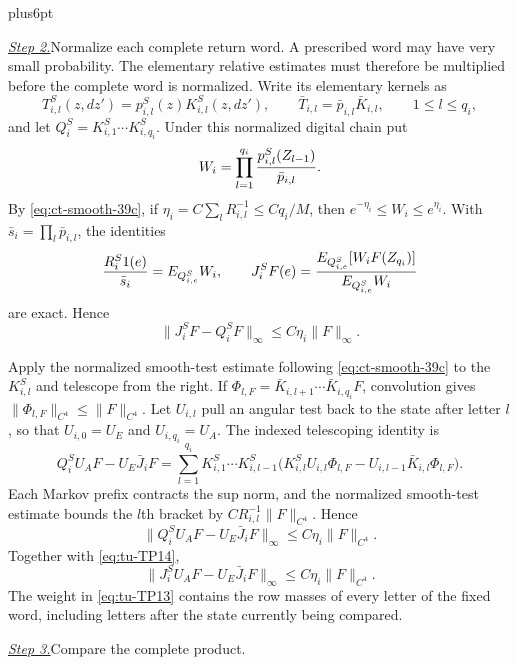 \documentclass[12pt,reqno]{amsart}
\makeatletter
\theoremstyle{plain}
\theoremstyle{definition}
\theoremstyle{remark}
\renewenvironment{proof}[1][\proofname]{%
  \par
  \pushQED{\qed}%
  \normalfont
  \topsep6pt plus6pt\relax
  \trivlist
  \item[\hskip\labelsep\slshape #1\@addpunct{.}]%
  \ignorespaces
}{%
  \popQED
  \endtrivlist
  \@endpefalse
}
\DeclareRobustCommand{\qed}{%
  \leavevmode\unskip\penalty9999\hbox{}\nobreak
  \ifmmode
    \makebox[0pt][l]{\qquad\hbox{\qedsymbol}}%
  \else
    \qquad\hbox{\qedsymbol}%
  \fi
}
\renewcommand{\qedsymbol}{\rule[.47pt]{4pt}{6pt}}
\numberwithin{equation}{section}
\makeatother
\begin{document}
\begin{proof}[Proof of Lemma~\ref{lem:typed-centered-endpoint-product}]
\smallskip\noindent
\underline{\textit{Step 2.}}\quad Normalize each complete return word.
A prescribed word may have very small probability. The elementary
relative estimates must therefore be multiplied before the complete word
is normalized. Write its elementary kernels as
\[
 T_{i,l}^S(z,dz')=p_{i,l}^S(z)K_{i,l}^S(z,dz'),\qquad
 \bar T_{i,l}=\bar p_{i,l}\bar K_{i,l},\qquad1\le l\le q_i,
\]
and let \(Q_i^S=K_{i,1}^S\cdots K_{i,q_i}^S\).  Under this normalized
digital chain put
\[
 W_i=\prod_{l=1}^{q_i}{p_{i,l}^S(Z_{l-1})\over\bar p_{i,l}}.
\]
By \eqref{eq:ct-smooth-39c}, if \(\eta_i=C\sum_lR_{i,l}^{-1}\le Cq_i/M\), then
\(e^{-\eta_i}\le W_i\le e^{\eta_i}\).  With
\(\bar s_i=\prod_l\bar p_{i,l}\), the identities
\begin{equation}
 {R_i^S1(e)\over\bar s_i}=E_{Q_{i,e}^S}W_i,\qquad
 J_i^SF(e)={E_{Q_{i,e}^S}[W_iF(Z_{q_i})]
                 \over E_{Q_{i,e}^S}W_i}                  \label{eq:tu-TP13}
\end{equation}
are exact.  Hence
\begin{equation}
             \|J_i^SF-Q_i^SF\|_\infty
             \le C\eta_i\|F\|_\infty.                    \label{eq:tu-TP14}
\end{equation}

Apply the normalized smooth-test estimate following \eqref{eq:ct-smooth-39c} to the
\(K_{i,l}^S\) and telescope from the right.  If
\(\Phi_{l,F}=\bar K_{i,l+1}\cdots\bar K_{i,q_i}F\), convolution gives
\(\|\Phi_{l,F}\|_{C^4}\le\|F\|_{C^4}\). Let $U_{i,l}$ pull an
angular test back to the state after letter $l$, so that
$U_{i,0}=U_E$ and $U_{i,q_i}=U_A$. The indexed telescoping identity is
\[
 Q_i^SU_AF-U_E\bar J_iF
 =\sum_{l=1}^{q_i}K_{i,1}^S\cdots K_{i,l-1}^S
 \bigl(K_{i,l}^SU_{i,l}\Phi_{l,F}
       -U_{i,l-1}\bar K_{i,l}\Phi_{l,F}\bigr).
\]
Each Markov prefix contracts the sup norm, and the normalized
smooth-test estimate bounds the $l$th bracket by
$CR_{i,l}^{-1}\|F\|_{C^4}$. Hence
\[
 \|Q_i^SU_AF-U_E\bar J_iF\|_\infty
       \le C\eta_i\|F\|_{C^4}.
\]
Together with \eqref{eq:tu-TP14},
\begin{equation}
 \|J_i^SU_AF-U_E\bar J_iF\|_\infty
       \le C\eta_i\|F\|_{C^4}.                            \label{eq:tu-TP15}
\end{equation}
The weight in \eqref{eq:tu-TP13} contains the row masses of every letter of the fixed
word, including letters after the state currently being compared.

\smallskip\noindent
\underline{\textit{Step 3.}}\quad Compare the complete product.


\end{proof}
\end{document}
